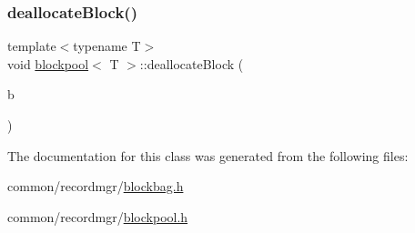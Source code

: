 \mbox{\label{classblockpool_a513720b0f74d4cec679eff69b3dd8d34}} 
\subsubsection{\texorpdfstring{deallocate\+Block()}{deallocateBlock()}}
{\footnotesize\ttfamily template$<$typename T$>$ \\
void \hyperlink{classblockpool}{blockpool}$<$ T $>$\+::deallocate\+Block (\begin{DoxyParamCaption}\item[{\hyperlink{classblock}{block}$<$ T $>$ $\ast$const}]{b }\end{DoxyParamCaption})\hspace{0.3cm}{\ttfamily [inline]}}



The documentation for this class was generated from the following files\+:\begin{DoxyCompactItemize}
\item 
common/recordmgr/\hyperlink{blockbag_8h}{blockbag.\+h}\item 
common/recordmgr/\hyperlink{blockpool_8h}{blockpool.\+h}\end{DoxyCompactItemize}

